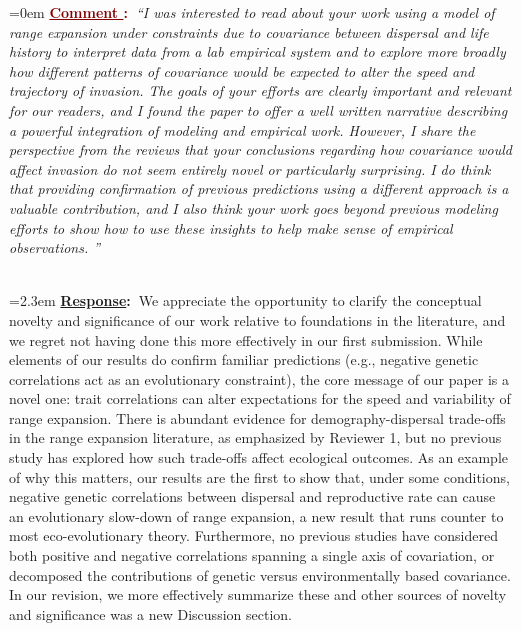 \documentclass[12pt]{article}
\newcounter{cN}
\newcommand{\comment}[1]{
	\vspace{2em}
	\refstepcounter{cN} %
	\noindent \hangindent=0em \textbf{\textcolor{Maroon}{\uline{Comment \thecN}:~}}\emph{``#1''}
	}
\newcommand{\response}[1]{
	\\[0.25em]
	\hangindent=2.3em \textbf{\textcolor{NavyBlue}{\uline{Response}:~}}#1
	}
\begin{document}
\comment{I was interested to read about your work using a model of range expansion under constraints due to covariance between dispersal and life history to interpret data from a lab empirical system and to explore more broadly how different patterns of covariance would be expected to alter the speed and trajectory of invasion.
The goals of your efforts are clearly important and relevant for our readers, and I found the paper to offer a well written narrative describing a powerful integration of modeling and empirical work.
However, I share the perspective from the reviews that your conclusions regarding how covariance would affect invasion do not seem entirely novel or particularly surprising.
I do think that providing confirmation of previous predictions using a different approach is a valuable contribution, and I also think your work goes beyond previous modeling efforts to show how to use these insights to help make sense of empirical observations. }
\response{We appreciate the opportunity to clarify the conceptual novelty and significance of our work relative to foundations in the literature, and we regret not having done this more effectively in our first submission.
While elements of our results do confirm familiar predictions (e.g., negative genetic correlations act as an evolutionary constraint), the core message of our paper is a novel one: trait correlations can alter expectations for the speed and variability of range expansion.
There is abundant evidence for demography-dispersal trade-offs in the range expansion literature, as emphasized by Reviewer 1, but no previous study has explored how such trade-offs affect ecological outcomes.
As an example of why this matters, our results are the first to show that, under some conditions, negative genetic correlations between dispersal and reproductive rate can cause an evolutionary slow-down of range expansion, a new result that runs counter to most eco-evolutionary theory.
Furthermore, no previous studies have considered both positive and negative correlations spanning a single axis of covariation, or decomposed the contributions of genetic versus environmentally based covariance.
In our revision, we more effectively summarize these and other sources of novelty and significance was a new Discussion section.}
\end{document}
